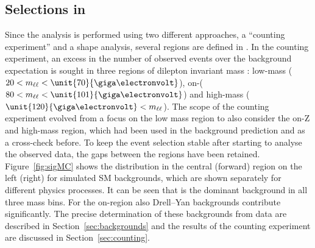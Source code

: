 \subsection{Selections in \mll}
Since the analysis is performed using two different approaches, a ``counting experiment'' and a shape analysis, several regions are defined in \mll. In the counting experiment, an excess in the number of observed events over the background expectation is sought in three regions of dilepton invariant mass \mll: low-mass ($\mathrm{20}< \mll < \unit{70}{\giga\electronvolt}$), on-\Z ($\mathrm{80}< \mll < \unit{101}{\giga\electronvolt}$) and high-mass ($\unit{120}{\giga\electronvolt} < \mll$). The scope of the counting experiment evolved from a focus on the low mass region to also consider the on-Z and high-mass region, which had been used in the background prediction and as a cross-check before. To keep the event selection stable after starting to analyse the observed data, the gaps between the regions have been retained. Figure~\ref{fig:sigMC} shows the \mll distribution in the central (forward) region on the left (right) for simulated SM backgrounds, which are shown separately for different physics processes. It can be seen that \ttbar is the dominant background in all three mass bins. For the on-\Z region also Drell--Yan backgrounds contribute significantly. The precise determination of these backgrounds from data are described in Section~\ref{sec:backgrounds} and the results of the counting experiment are discussed in Section~\ref{sec:counting}.

